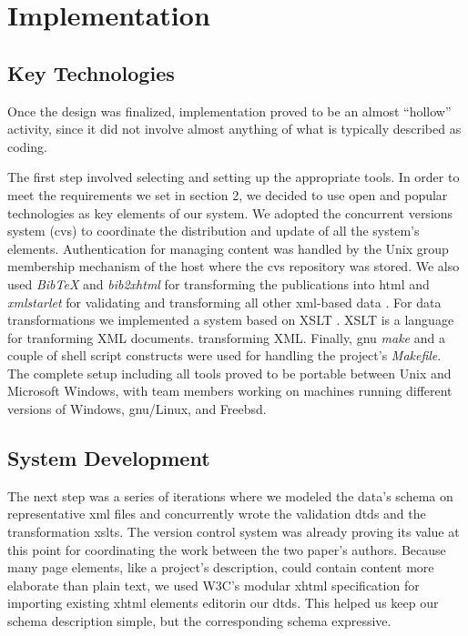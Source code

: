 \documentclass[10pt]{article}
\begin{document}
\section{Implementation}

\subsection{Key Technologies}

Once the design was finalized,
implementation proved to be an almost ``hollow'' activity,
since it did not involve almost anything of what
is typically described as coding.

The first step involved selecting and setting up the
appropriate tools. In order to meet the requirements we set in section 2, 
we decided to use open and popular
technologies as key elements of our system.
We adopted the concurrent versions system
({\sc cvs}) \cite{BF01} \cite{CVS} to coordinate the distribution
and update of all the system's elements.
Authentication for managing content was handled by the
Unix group membership mechanism of the host where the
{\sc cvs} repository was stored.
We also used
{\em BibTeX} \cite{Pa88} \cite{Ja99} and {\em bib2xhtml} for transforming the publications
into {\sc html} and
{\em xmlstarlet} \cite{Gru04} for validating and transforming
all other {\sc xml}-based data \cite{W3C_XML}.
For data transformations we 
implemented a system based on XSLT \cite{W3C_XSLT}. XSLT is a language for tranforming XML documents.
transforming XML.
Finally, {\sc gnu} {\em make} \cite{gnu_make} and a couple of shell script
constructs were used for handling the project's {\em Makefile}.
The complete setup including all tools proved to be portable
between Unix and Microsoft Windows, with team members working
on machines running different versions of Windows, {\sc gnu}/Linux,
and Free{\sc bsd}.

\subsection{System Development}

The next step was a series of iterations where we
modeled the data's schema on representative {\sc xml}
files and concurrently wrote the validation {\sc dtd}s
and the transformation {\sc xslt}s.
The version control system was already proving its value
at this point
for coordinating the work between the two paper's authors.
Because many page elements, like a project's description,
could contain content more elaborate than plain text,
we used W3C's modular {\sc xhtml} specification for
importing existing {\sc xhtml} elements editorin our {\sc dtd}s.
This helped us keep our schema description simple,
but the corresponding schema expressive.
\end{document}
